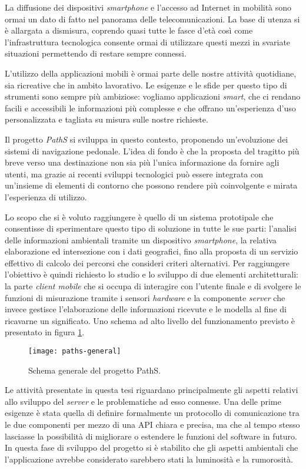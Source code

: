 La diffusione dei dispositivi \emph{smartphone} e l'accesso ad Internet in mobilità sono ormai un dato di fatto nel panorama delle telecomunicazioni. La base di utenza si è allargata a dismisura, coprendo quasi tutte le fasce d'età così come l'infrastruttura tecnologica consente ormai di utilizzare questi mezzi in svariate situazioni permettendo di restare sempre connessi. 

L'utilizzo della applicazioni mobili è ormai parte delle nostre attività quotidiane, sia ricreative che in ambito lavorativo. Le esigenze e le sfide per questo tipo di strumenti sono sempre più ambiziose: vogliamo applicazioni \emph{smart}, che ci rendano facili e accessibili le informazioni più complesse e che offrano un'esperienza d'uso personalizzata e tagliata su misura sulle nostre richieste.

Il progetto \emph{PathS} si sviluppa in questo contesto, proponendo un'evoluzione dei sistemi di navigazione pedonale. L'idea di fondo è che la  proposta del tragitto più breve verso una destinazione non sia più l'unica informazione da fornire agli utenti, ma grazie ai recenti sviluppi tecnologici può essere integrata con un'insieme di elementi di contorno che possono rendere più coinvolgente e mirata l'esperienza di utilizzo.

Lo scopo che si è voluto raggiungere è quello di un sistema prototipale che consentisse di sperimentare questo tipo di soluzione in tutte le sue parti: l'analisi delle informazioni ambientali tramite un dispositivo \emph{smartphone}, la relativa elaborazione ed intersezione con i dati geografici, fino alla proposta di un servizio effettivo di calcolo dei percorsi che consideri criteri alternativi. Per raggiungere l'obiettivo è quindi richiesto lo studio e lo sviluppo di due elementi architetturali: la parte \emph{client mobile} che si occupa di interagire con l'utente finale e di svolgere le funzioni di misurazione tramite i sensori \emph{hardware} e la componente \emph{server} che invece gestisce l'elaborazione delle informazioni ricevute e le modella al fine di ricavarne un significato. Uno schema ad alto livello del funzionamento previsto è presentato in figura \ref{fig:paths-general}.

\begin{figure}[ht]
  \centering
  \texttt{[image: paths-general]}
  \caption{\footnotesize{Schema generale del progetto PathS.}}
  \label{fig:paths-general}
\end{figure}

Le attività presentate in questa tesi riguardano principalmente gli aspetti relativi allo sviluppo del \emph{server} e le problematiche ad esso connesse. Una delle prime esigenze è stata quella di definire formalmente un protocollo di comunicazione tra le due componenti per mezzo di una API chiara e precisa, ma che al tempo stesso lasciasse la possibilità di migliorare o estendere le funzioni del software in futuro. In questa fase di sviluppo del progetto si è stabilito che gli aspetti ambientali che l'applicazione avrebbe considerato sarebbero stati la luminosità e la rumorosità.


